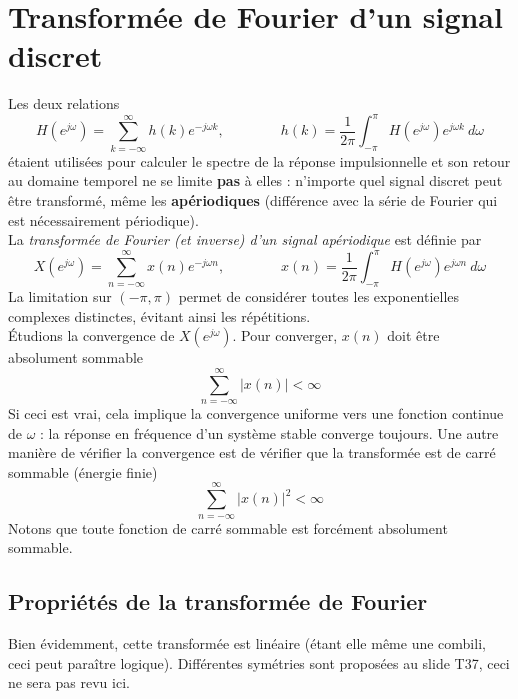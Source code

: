 \section{Transformée de Fourier d'un signal discret}
Les deux relations
\begin{equation}
H(e^{j\omega}) = \sum_{k=-\infty}^\infty h(k)e^{-j\omega k},\qquad\qquad h(k) = \dfrac{1}{2\pi}
\int_{-\pi}^\pi H(e^{j\omega}) e^{j\omega k}\ d\omega
\end{equation}
étaient utilisées pour calculer le spectre de la réponse impulsionnelle et son 
retour au domaine temporel ne se limite \textbf{pas} à elles : n'importe quel signal discret 
peut être transformé, même les \textbf{apériodiques} (différence avec la série de Fourier qui 
est nécessairement périodique).\\
La \textit{transformée de Fourier (et inverse) d'un signal apériodique} est définie par
\begin{equation}
X(e^{j\omega}) = \sum_{n=-\infty}^\infty x(n)e^{-j\omega n},\qquad\qquad x(n) = \dfrac{1}{2\pi}
\int_{-\pi}^\pi H(e^{j\omega}) e^{j\omega n}\ d\omega
\end{equation}
La limitation sur $(-\pi,\pi)$ permet de considérer toutes les exponentielles complexes 
distinctes, évitant ainsi les répétitions. \\
Étudions la convergence de $X(e^{j\omega})$. Pour converger, $x(n)$ doit être absolument sommable
\begin{equation}
\sum_{n=-\infty}^\infty |x(n)|<\infty
\end{equation}
Si ceci est vrai, cela implique la convergence uniforme vers une fonction continue de $\omega$ : 
la réponse en fréquence d'un système stable converge toujours.  Une autre manière de vérifier la 
convergence est de vérifier que la transformée est de carré sommable (énergie finie)
\begin{equation}
\sum_{n=-\infty}^\infty |x(n)|^2<\infty
\end{equation}
Notons que toute fonction de carré sommable est forcément absolument sommable.

	\subsection{Propriétés de la transformée de Fourier}
	Bien évidemment, cette transformée est linéaire (étant elle même une combili, ceci peut 
	paraître logique). Différentes symétries sont proposées au slide T37, ceci ne sera pas 
	revu ici.
	
